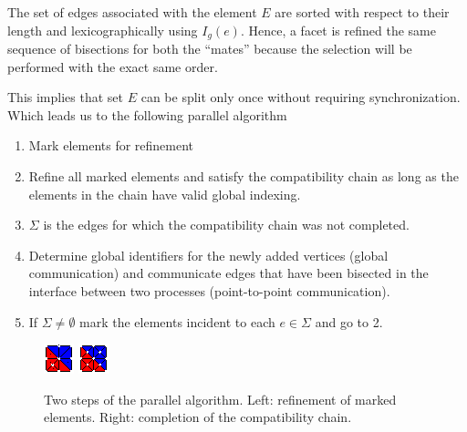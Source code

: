 \documentclass{article}
\begin{document}
The set of edges associated with the element $E$ are sorted with respect to their length and lexicographically using $I_g(e)$. Hence, a facet is refined the same sequence of bisections for both the ``mates'' because the selection will be performed with the exact same order.

This implies that set $E$ can be split only once without requiring synchronization. Which leads us to the following parallel algorithm

\begin{enumerate}
	\item Mark elements for refinement
	\item Refine all marked elements and satisfy the compatibility chain as long as the elements in the chain have valid global indexing.
	\item $\Sigma$ is the edges for which the compatibility chain was not completed.
	\item Determine global identifiers for the newly added vertices (global communication) and communicate edges that have been bisected in the interface between two processes (point-to-point communication). 
	\item If $\Sigma \neq \emptyset$ mark the elements incident to each $e \in \Sigma$ and go to 2.
\end{enumerate}


\begin{figure}[htbp]
	\centering
	\includegraphics[width=0.48\linewidth]{figures/partial} \hfill
	\includegraphics[width=0.48\linewidth]{figures/complete} 

	\caption{Two steps of the parallel algorithm. Left: refinement of marked elements. Right: completion of the compatibility chain.}
	\label{fig:par_algo}
\end{figure}
\end{document}
